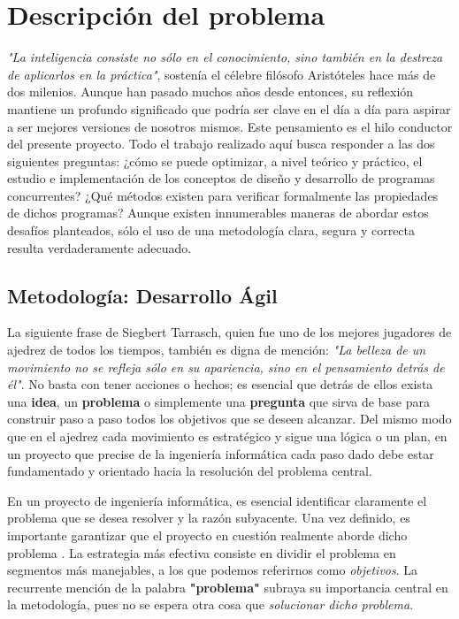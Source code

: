 \chapter{Descripción del problema}

\textit{"La inteligencia consiste no sólo en el conocimiento, sino también en la destreza de aplicarlos en la práctica"}, sostenía el célebre filósofo Aristóteles hace más de dos milenios. Aunque han pasado muchos años desde entonces, su reflexión mantiene un profundo significado que podría ser clave en el día a día para aspirar a ser mejores versiones de nosotros mismos. Este pensamiento es el hilo conductor del presente proyecto. Todo el trabajo realizado aquí busca responder a las dos siguientes preguntas: ¿cómo se puede optimizar, a nivel teórico y práctico, el estudio e implementación de los conceptos de diseño y desarrollo de programas concurrentes? ¿Qué métodos existen para verificar formalmente las propiedades de dichos programas? Aunque existen innumerables maneras de abordar estos desafíos planteados, sólo el uso de una metodología clara, segura y correcta resulta verdaderamente adecuado.

\section{Metodología: Desarrollo Ágil}
La siguiente frase de Siegbert Tarrasch, quien fue uno de los mejores jugadores de ajedrez de todos los tiempos, también es digna de mención: \textit{"La belleza de un movimiento no se refleja sólo en su apariencia, sino en el pensamiento detrás de él"}. No basta con tener acciones o hechos; es esencial que detrás de ellos exista una \textbf{idea}, un \textbf{problema} o simplemente una \textbf{pregunta} que sirva de base para construir paso a paso todos los objetivos que se deseen alcanzar. Del mismo modo que en el ajedrez cada movimiento es estratégico y sigue una lógica o un plan, en un proyecto que precise de la ingeniería informática cada paso dado debe estar fundamentado y orientado hacia la resolución del problema central.

\vspace{0.5cm}
En un proyecto de ingeniería informática, es esencial identificar claramente el problema que se desea resolver y la razón subyacente. Una vez definido, es importante garantizar que el proyecto en cuestión realmente aborde dicho problema \cite{jj-agile-objetivos}. La estrategia más efectiva consiste en dividir el problema en segmentos más manejables, a los que podemos referirnos como \textit{objetivos}. La recurrente mención de la palabra \textbf{"problema"} subraya su importancia central en la metodología, pues no se espera otra cosa que \textit{solucionar dicho problema}.

